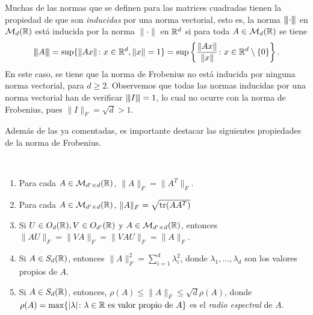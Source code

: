 Muchas de las normas que se definen para las matrices cuadradas tienen la propiedad de que son \emph{inducidas} por una norma vectorial, esto es, la norma ${\left\vert\kern-0.25ex\left\vert\kern-0.25ex\left\vert \cdot \right\vert\kern-0.25ex\right\vert\kern-0.25ex\right\vert}$ en $\mathcal{M}_{d}(\mathbb{R})$ está inducida por la norma $\|\cdot\|$ en $\mathbb{R}^{d}$ si para toda $A \in \mathcal{M}_{d}(\mathbb{R})$ se tiene
\[ {\left\vert\kern-0.25ex\left\vert\kern-0.25ex\left\vert A \right\vert\kern-0.25ex\right\vert\kern-0.25ex\right\vert} = \sup \{ \|Ax\| \colon x \in \mathbb{R}^d, \|x\| = 1 \} = \sup\left\{ \frac{\|Ax\|}{\|x\|} \colon x \in \mathbb{R}^d \setminus \{0\} \right\}. \]
En este caso, se tiene que la norma de Frobenius no está inducida por ninguna norma vectorial, para $d \ge 2$. Observemos que todas las normas inducidas por una norma vectorial han de verificar ${\left\vert\kern-0.25ex\left\vert\kern-0.25ex\left\vert I \right\vert\kern-0.25ex\right\vert\kern-0.25ex\right\vert} = 1$, lo cual no ocurre con la norma de Frobenius, pues $\|I\|_F = \sqrt{d} > 1$.

Además de las ya comentadas, es importante destacar las siguientes propiedades de la norma de Frobenius.

\begin{prop}~ \label{prop:prop_frobenius}
    \begin{enumerate}
        \item Para cada $A \in \mathcal{M}_{d' \times d}(\mathbb{R})$, $\|A\|_F = \|A^T\|_F$.
        \item Para cada $A \in \mathcal{M}_{d' \times d}(\mathbb{R})$, $\|A\|_F = \sqrt{\operatorname{tr}(AA^T)}$
        \item Si $U \in O_d(\mathbb{R}), V \in O_{d'}(\mathbb{R})$ y $A \in \mathcal{M}_{d' \times d}(\mathbb{R})$, entonces $\|AU\|_F = \|VA\|_F = \|VAU\|_F = \|A\|_F$.
        \item Si $A \in S_d(\mathbb{R})$, entonces $\|A\|_F^2 = \sum_{i=1}^d \lambda_i^2$, donde $\lambda_1,\dots,\lambda_d$ son los valores propios de $A$.
        \item Si $A \in S_d(\mathbb{R})$, entonces, $\rho(A) \le \|A\|_F \le \sqrt{d}\rho(A)$, donde $\rho(A) = \max\{|\lambda| \colon \lambda \in \mathbb{R} \text{ es valor propio de } A\}$ es el \emph{radio espectral} de $A$.
    \end{enumerate}
\end{prop}

